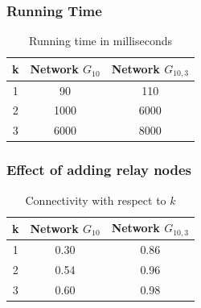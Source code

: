 \documentclass{beamer}
\begin{document}
\begin{frame}
\frametitle{Running Time}
\begin{table}[!htb]
    \begin{minipage}{1\linewidth}
   
      \centering
     \begin{tabular}{|c|c|c|}
     \hline
         k& Network $G_{10}$ &Network $G_{10,3}$\\
     \hline
     1&90& 110 \\\hline
     2&1000 &6000	\\\hline
3 &6000&8000	 \\\hline
\end{tabular}
 \caption{Running time in milliseconds}
\label{Tab:rtym1}
    \end{minipage}
\end{table}

\end{frame}

\begin{frame}
\frametitle{Effect of adding relay nodes}

\begin{table}[!htb]
  \centering
 \begin{minipage}{.5\linewidth}
     \begin{tabular}{|c|c|c|}
     \hline
     k & Network $G_{10}$ & Network $G_{10,3}$  \\
     \hline
      1 & 0.30 & 0.86 \\\hline
	  2 & 0.54 & 0.96\\\hline
	  3 &0.60 & 0.98 \\\hline
\end{tabular}
    \end{minipage}
     \caption{Connectivity with respect to $k$}
      \label{Tab:SRC}   
\end{table}
\end{frame}
\end{document}
